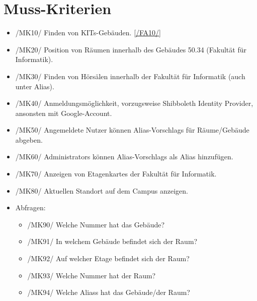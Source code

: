 \section{Muss-Kriterien}

\begin{itemize}

    \item{/MK10/} \label{/MK10/}Finden von \Glspl{KIT}-Gebäuden. \ref{/FA10/}
    \item{/MK20/} \label{/MK20/}Position von Räumen innerhalb des Gebäudes 50.34 (Fakultät für Informatik).
    \item{/MK30/} \label{/MK30/}Finden von Hörsälen innerhalb der Fakultät für Informatik (auch unter Alias).
    \item{/MK40/} \label{/MK40/}Anmeldungsmöglichkeit, vorzugsweise Shibboleth Identity Provider, ansonsten mit Google-Account.
    \item{/MK50/} \label{/MK50/}Angemeldete Nutzer können \Glspl{Alias-Vorschlag} für Räume/Gebäude abgeben.
    \item{/MK60/} \label{/MK60/}\Glspl{Administrator} können \Glspl{Alias-Vorschlag} als \Gls{Alias} hinzufügen.
    \item{/MK70/} \label{/MK70/}Anzeigen von \Glspl{Etagenkarte} der Fakultät für Informatik.
    \item{/MK80/} \label{/MK80/}Aktuellen Standort auf dem \Gls{Campus} anzeigen.
    \item Abfragen:
        \begin{itemize}
            \item{/MK90/} \label{/MK90/}Welche Nummer hat das Gebäude?
            \item{/MK91/} \label{/MK91/}In welchem Gebäude befindet sich der Raum?
            \item{/MK92/} \label{/MK92/}Auf welcher Etage befindet sich der Raum?
            \item{/MK93/} \label{/MK93/}Welche Nummer hat der Raum?
            \item{/MK94/} \label{/MK94/}Welche \Glspl{Alias} hat das Gebäude/der Raum?
        \end{itemize}

\end{itemize}
